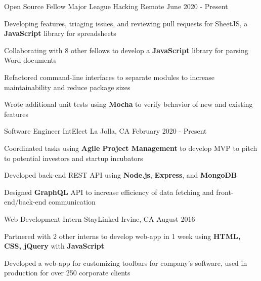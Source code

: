 \documentclass[]{awesome-cv}
\begin{document}
\vspace{-3mm}
\begin{cventries}
	\cventry
	{Open Source Fellow}
	{Major League Hacking}
  {Remote}
	{June 2020 - Present}
	{\begin{cvitems}
    \item {Developing features, triaging issues, and reviewing pull requests for
      SheetJS, a \textbf{JavaScript} library for spreadsheets}
    \item {Collaborating with 8 other fellows to develop a \textbf{JavaScript} library
    for parsing Word documents}
    \item {Refactored command-line interfaces to separate modules to increase
      maintainability and reduce package sizes}
    \item {Wrote additional unit tests using \textbf{Mocha} to verify behavior
      of new and existing features}
		\end{cvitems}}

	\vspace{-3mm}
	\cventry
	{Software Engineer}
	{IntElect}
	{La Jolla, CA}
	{February 2020 - Present}
	{\begin{cvitems}
    \item {Coordinated tasks using \textbf{Agile
      Project Management} to develop MVP to pitch to potential investors and
      startup incubators}
    \item {Developed back-end REST API
      using \textbf{Node.js}, \textbf{Express}, and \textbf{MongoDB}}
    \item {Designed \textbf{GraphQL} API to increase efficiency of data fetching
      and front-end/back-end communication}
		\end{cvitems}}

	\vspace{-3mm}
	\cventry
	{Web Development Intern}
	{StayLinked}
	{Irvine, CA}
	{August 2016}
	{\begin{cvitems}
    \item {Partnered with 2 other interns to develop web-app in 1 week using
      \textbf{HTML, CSS, jQuery} with \textbf{JavaScript}}
		\item {Developed a web-app for customizing toolbars for company’s software,
      used in production for over 250 corporate clients}
		\end{cvitems}}
\end{cventries}
\end{document}
